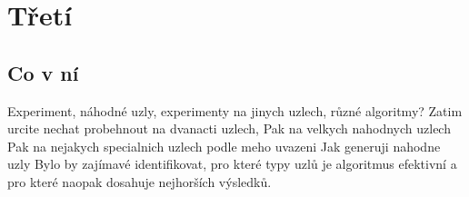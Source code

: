 
\chapter{Třetí}

\section{Co v ní}
Experiment, náhodné uzly, experimenty na jinych uzlech, různé algoritmy?
Zatim urcite nechat probehnout na dvanacti uzlech,
Pak na velkych nahodnych uzlech
Pak na nejakych specialnich uzlech podle meho uvazeni
Jak generuji nahodne uzly
Bylo by zajímavé identifikovat, pro které typy uzlů je algoritmus efektivní a pro které naopak dosahuje nejhorších výsledků.